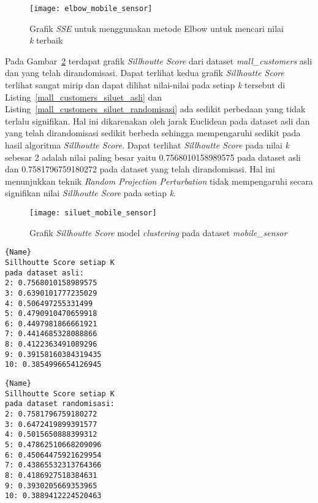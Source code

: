 \begin{figure}
	\centering
	\texttt{[image: elbow\_mobile\_sensor]}
	\caption{Grafik \textit{SSE} untuk menggunakan metode Elbow untuk mencari nilai \textit{k} terbaik}
	\label{fig:elbow_mobile_sensor}
\end{figure}

Pada Gambar~\ref{fig:siluet_mobile_sensor} terdapat grafik \textit{Sillhoutte Score} dari dataset \textit{mall\_customers} asli dan yang telah dirandomisasi. Dapat terlihat kedua grafik \textit{Sillhoutte Score} terlihat sangat mirip dan dapat dilihat nilai-nilai pada setiap \textit{k} tersebut di Listing~\ref{mall_customers_siluet_asli} dan Listing~\ref{mall_customers_siluet_randomisasi} ada sedikit perbedaan yang tidak terlalu signifikan. Hal ini dikarenakan oleh jarak Euclidean pada dataset asli dan yang telah dirandomisasi sedikit berbeda sehingga mempengaruhi sedikit pada hasil algoritma \textit{Sillhoutte Score}. Dapat terlihat \textit{Sillhoutte Score} pada nilai \textit{k} sebesar 2 adalah nilai paling besar yaitu 0.7568010158989575 pada dataset asli dan 0.7581796759180272 pada dataset yang telah dirandomisasi. Hal ini menunjukkan teknik \textit{Random Projection Perturbation} tidak mempengaruhi secara signifikan nilai \textit{Sillhoutte Score} pada setiap \textit{k}.

\begin{figure}
	\centering
	\texttt{[image: siluet\_mobile\_sensor]}
	\caption{Grafik \textit{Sillhoutte Score} model \textit{clustering} pada dataset \textit{mobile\_sensor}}
	\label{fig:siluet_mobile_sensor}
\end{figure}


\noindent\begin{minipage}{.48\textwidth}
\begin{lstlisting}[caption=Sillhoutte Score Dataset Asli,frame=tlrb, label=mall_customers_siluet_asli]{Name}
Sillhoutte Score setiap K
pada dataset asli: 
2: 0.7568010158989575
3: 0.6390101777235029
4: 0.506497255331499
5: 0.4790910470659918
6: 0.4497981866661921
7: 0.4414685328088866
8: 0.4122363491089296
9: 0.39158160384319435
10: 0.3854996654126945
\end{lstlisting}
\end{minipage}\hfill
\begin{minipage}{.48\textwidth}
\begin{lstlisting}[caption=Sillhoutte Score Dataset Randomisasi,frame=tlrb, label=mall_customers_siluet_randomisasi]{Name}
Sillhoutte Score setiap K
pada dataset randomisasi: 
2: 0.7581796759180272
3: 0.6472419899391577
4: 0.5015650888399312
5: 0.47862510668209096
6: 0.45064475921629954
7: 0.43865532313764366
8: 0.4186927518384631
9: 0.3930205669353965
10: 0.3889412224520463
\end{lstlisting}
\end{minipage}

